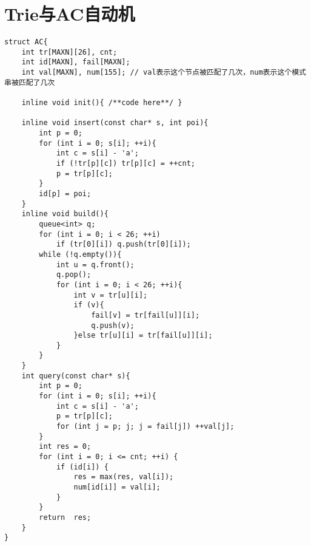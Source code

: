 \section{Trie与AC自动机}
\begin{lstlisting}
struct AC{
    int tr[MAXN][26], cnt;
    int id[MAXN], fail[MAXN];
    int val[MAXN], num[155]; // val表示这个节点被匹配了几次，num表示这个模式串被匹配了几次

    inline void init(){ /**code here**/ }

    inline void insert(const char* s, int poi){
        int p = 0;
        for (int i = 0; s[i]; ++i){
            int c = s[i] - 'a';
            if (!tr[p][c]) tr[p][c] = ++cnt;
            p = tr[p][c];
        }
        id[p] = poi;
    }
    inline void build(){
        queue<int> q;
        for (int i = 0; i < 26; ++i)
            if (tr[0][i]) q.push(tr[0][i]);
        while (!q.empty()){
            int u = q.front();
            q.pop();
            for (int i = 0; i < 26; ++i){
                int v = tr[u][i];
                if (v){
                    fail[v] = tr[fail[u]][i];
                    q.push(v);
                }else tr[u][i] = tr[fail[u]][i];
            }
        }
    }
    int query(const char* s){
        int p = 0;
        for (int i = 0; s[i]; ++i){
            int c = s[i] - 'a';
            p = tr[p][c];
            for (int j = p; j; j = fail[j]) ++val[j];
        }
        int res = 0;
        for (int i = 0; i <= cnt; ++i) {
            if (id[i]) {
                res = max(res, val[i]);
                num[id[i]] = val[i];
            }
        }
        return  res;
    }
}
\end{lstlisting}